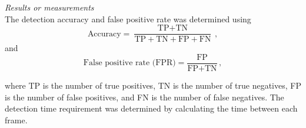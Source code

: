 \textit{Results or measurements}\\
The detection accuracy and false positive rate was determined using
\begin{equation}
  \text{Accuracy} = \frac{\text{TP} + \text{TN}}{\text{TP} + \text{TN} + \text{FP} + \text{FN}}\,,
\end{equation}
and
\begin{equation}
  \text{False positive rate (FPR)} = \frac{\text{FP}}{\text{FP} + \text{TN}}\,,
\end{equation}

where TP is the number of true positives, TN is the number of true negatives, FP is the number of false positives, and FN is the number of false negatives. The detection time requirement was determined by calculating the time between each frame.

